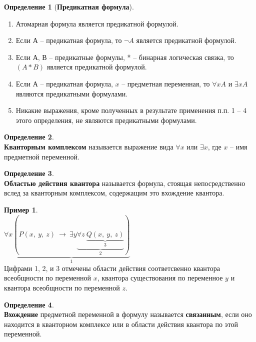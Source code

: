 \documentclass[a4paper,12pt]{article}
\theoremstyle{definition} %
\newtheorem{definition}{Определение}[section]
\newtheorem{example}{Пример}[section]
\theoremstyle{definition} %
\theoremstyle{remark} %
\newcommand{\krs}[1]{\left(#1\right)}
\begin{document}
	\begin{definition}[\textbf{Предикатная формула}] \
		\begin{enumerate}
			\item Атомарная формула является предикатной формулой.
			\item Если А -- предикатная формула, то $\neg A$ является предикатной формулой.
			\item Если А, В -- предикатные формулы, * -- бинарная логическая связка, то $\krs{A * B}$ является предикатной формулой.
			\item Если А -- предикатная формула, $x$ -- предметная переменная, то $\forall x A$ и $\exists x A$ являются предикатными формулами.
			\item Никакие выражения, кроме полученных в результате применения п.п. 1 -- 4 этого определения, не являются предикатными формулами.
		\end{enumerate}
	\end{definition}
	
	\begin{definition} \ \\[1ex]
		\textbf{Кванторным комплексом} называется выражение вида $\forall x$ или $\exists x$, где $x$ -- имя предметной переменной.
	\end{definition}

	\begin{definition} \ \\[1ex]
		\textbf{Областью действия квантора} называется формула, стоящая непосредственно вслед за кванторным комплексом, содержащим это вхождение квантора.
	\end{definition}

	\begin{example} \ \\[1ex]
		$\forall x \underbrace{(P \krs{x, \ y, \ z} \ \rightarrow \ \exists y \underbrace{\forall z \ \underbrace{Q \krs{x, \ y, \ z}}_3}_2 )}_{1}$\\[1ex]
		Цифрами 1, 2, и 3 отмечены области действия соответсвенно квантора всеобщности по переменной $x$, квантора существования по переменное $y$ и квантора всеобщности по переменной $z$.
	\end{example}

	\begin{definition} \ \\[1ex]
		\textbf{Вхождение} предметной переменной в формулу называется \textbf{связанным}, если оно находится в кванторном комплексе или в области действия квантора по этой переменной.
	\end{definition}
\end{document}
